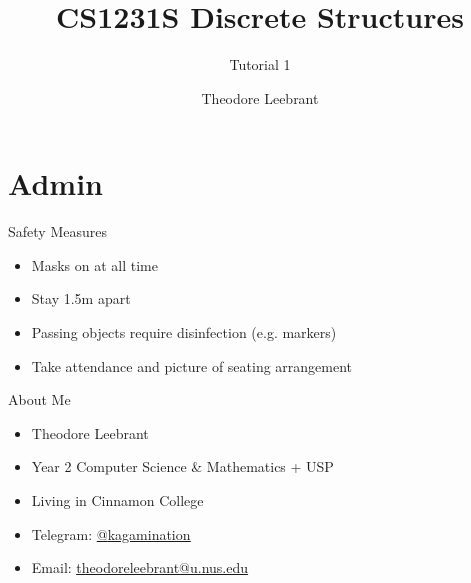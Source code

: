 \documentclass[10pt]{beamer}
\title{CS1231S Discrete Structures}
\subtitle{Tutorial 1}
\date{}
\author{Theodore Leebrant}
\institute{Tutorial Group 3A}
\begin{document}
\maketitle


\section[Admin Stuff]{Admin}


\begin{frame}{Safety Measures}
\begin{itemize}
  \item Masks on at all time
  \item Stay 1.5m apart
  \item Passing objects require disinfection (e.g. markers)
  \item Take attendance and picture of seating arrangement
\end{itemize}
\end{frame}

\begin{frame}[fragile]{About Me}
  \begin{itemize}
    \item Theodore Leebrant
    \item Year 2 Computer Science \& Mathematics + USP
    \item Living in Cinnamon College
    \item Telegram: \href{https://t.me/kagamination}{@\underline{kagamination}}
    \item Email: \href{mailto:theodoreleebrant@u.nus.edu}{\underline{theodoreleebrant@u.nus.edu}}
  \end{itemize}
\end{frame}
\end{document}
